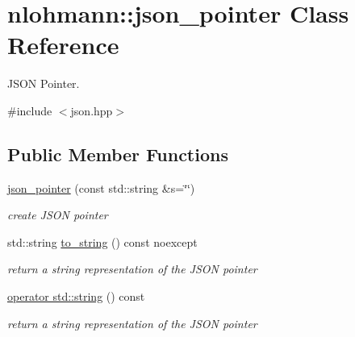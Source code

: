 \hypertarget{classnlohmann_1_1json__pointer}{}\section{nlohmann\+:\+:json\+\_\+pointer Class Reference}
\label{classnlohmann_1_1json__pointer}


J\+S\+ON Pointer.  




{\ttfamily \#include $<$json.\+hpp$>$}

\subsection*{Public Member Functions}
\begin{DoxyCompactItemize}
\item 
\hyperlink{classnlohmann_1_1json__pointer_a203910314c0be11c6b2b2cb53a9ad3aa}{json\+\_\+pointer} (const std\+::string \&s=\char`\"{}\char`\"{})
\begin{DoxyCompactList}\small\item\em create J\+S\+ON pointer \end{DoxyCompactList}\item 
std\+::string \hyperlink{classnlohmann_1_1json__pointer_a0920ebb015398813880e3c0f8464526e}{to\+\_\+string} () const noexcept
\begin{DoxyCompactList}\small\item\em return a string representation of the J\+S\+ON pointer \end{DoxyCompactList}\item 
\hyperlink{classnlohmann_1_1json__pointer_a7c2d84318102529336beab1b5952bba0}{operator std\+::string} () const
\begin{DoxyCompactList}\small\item\em return a string representation of the J\+S\+ON pointer \end{DoxyCompactList}\end{DoxyCompactItemize}
